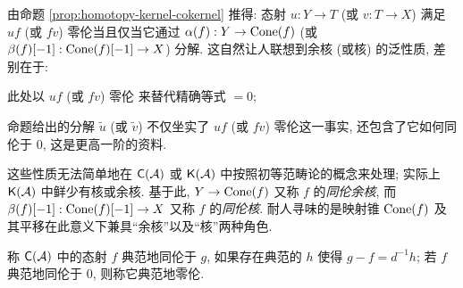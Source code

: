 \begin{remark}\label{rem:homotopy-kernel-cokernel}
	由命题 \ref{prop:homotopy-kernel-cokernel} 推得: 态射 $u: Y \to T$ (或 $v: T \to X$) 满足 $uf$ (或 $fv$) 零伦当且仅当它通过 $\alpha(f): Y \to \operatorname{Cone}(f)$ (或 $\beta(f)[-1]: \operatorname{Cone}(f)[-1] \to X$) 分解. 这自然让人联想到余核 (或核) 的泛性质, 差别在于:
	\begin{compactitem}
		\item 此处以 $uf$ (或 $fv$) 零伦 来替代精确等式 $= 0$;
		\item 命题给出的分解 $\tilde{u}$ (或 $\tilde{v}$) 不仅坐实了 $uf$ (或 $fv$) 零伦这一事实, 还包含了它如何同伦于 $0$, 这是更高一阶的资料.
	\end{compactitem}
	这些性质无法简单地在 $\mathsf{C}(\mathcal{A})$ 或 $\mathsf{K}(\mathcal{A})$ 中按照初等范畴论的概念来处理; 实际上 $\mathsf{K}(\mathcal{A})$ 中鲜少有核或余核. 基于此, $Y \to \operatorname{Cone}(f)$ 又称 $f$ 的\emph{同伦余核}, 而 $\beta(f)[-1]: \operatorname{Cone}(f)[-1] \to X$ 又称 $f$ 的\emph{同伦核}. 耐人寻味的是映射锥 $\operatorname{Cone}(f)$ 及其平移在此意义下兼具``余核''以及``核''两种角色.
\end{remark}

称 $\mathsf{C}(\mathcal{A})$ 中的态射 $f$ 典范地同伦于 $g$, 如果存在典范的 $h$ 使得 $g -f = d^{-1} h$; 若 $f$ 典范地同伦于 $0$, 则称它典范地零伦.

